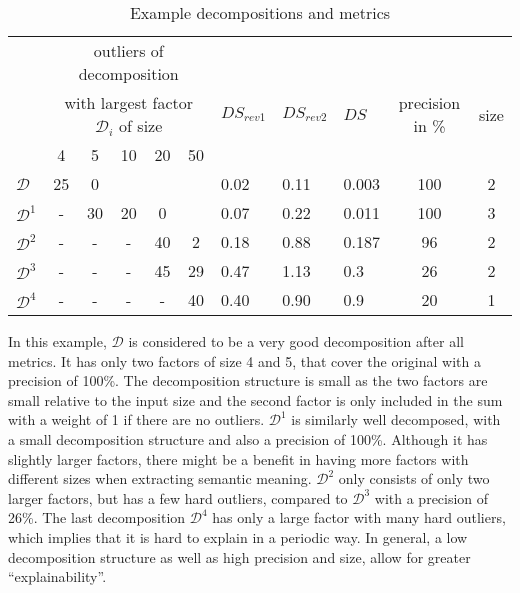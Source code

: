 \begin{table}[h]
	\centering
	\begin{tabular}{l|ccccc|lllcc}
		& \multicolumn{5}{c}{outliers of decomposition}  & & & & & \\
		& \multicolumn{5}{c}{with largest factor $\mathcal{D}_i$ of size} & $DS_{rev 1}$ & $DS_{rev 2}$ & $DS$ & precision in \% & size \\
		& 4 & 5 & 10 & 20 & 50 & & & & & \\
		\hline
		$\mathcal{D}$ & 25 & 0 & &  & & 0.02 & 0.11 & 0.003 & 100 & 2\\		
		$\mathcal{D}^1$ & - & 30 & 20 & 0 & & 0.07 & 0.22& 0.011 & 100 & 3\\
		$\mathcal{D}^2$ & - & - & - & 40 & 2 & 0.18 & 0.88 & 0.187 &  96 & 2\\
		$\mathcal{D}^3$ & - & - & - & 45 & 29 & 0.47 & 1.13 & 0.3 & 26 & 2\\
		$\mathcal{D}^4$ & - & - & - & - & 40 & 0.40 & 0.90 & 0.9 & 20 & 1\\
	\end{tabular}
	\caption{Example decompositions and metrics}
	\label{tab:example-decompositions-and-metrics}
\end{table}
In this example, $\mathcal{D}$ is considered to be a very good decomposition after all metrics.
It has only two factors of size 4 and 5, that cover the original \DFA with a precision of 100\%.
The decomposition structure is small as the two factors are small relative to the input size and the second factor is only included in the sum with a weight of 1 if there are no outliers.
$\mathcal{D}^1$ is similarly well decomposed, with a small decomposition structure and also a precision of 100\%.
Although it has slightly larger factors, there might be a benefit in having more factors with different sizes when extracting semantic meaning.
$\mathcal{D}^2$ only consists of only two larger factors, but has a few hard outliers, compared to $\mathcal{D}^3$ with a precision of 26\%.
The last decomposition $\mathcal{D}^4$ has only a large factor with many hard outliers, which implies that it is hard to explain in a periodic way.
In general, a low decomposition structure as well as high precision and size, allow for greater \enquote{explainability}.



